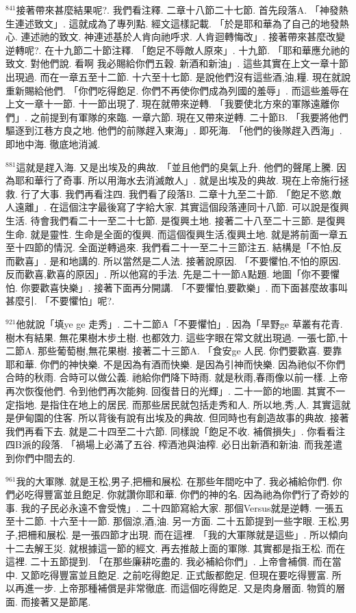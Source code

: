 \documentclass{book}
\begin{document}
$^{841}$接著帶來甚麼結果呢?.
我們看注釋.
二章十八節二十七節.
首先段落A.
「神發熱生連述致文」.
這就成為了專列點.
經文這樣記載.
「於是耶和華為了自己的地發熱心.
連述祂的致文.
神連述基於人肯向祂呼求.
人肯迴轉悔改」.
接著帶來甚麼改變逆轉呢?.
在十九節二十節注釋.
「飽足不辱敵人原來」.
十九節.
「耶和華應允祂的致文.
對他們說.
看啊 我必賜給你們五穀.
新酒和新油」.
這些其實在上文一章十節出現過.
而在一章五至十二節.
十六至十七節.
是說他們沒有這些酒,油,糧.
現在就說重新賜給他們.
「你們吃得飽足.
你們不再使你們成為列國的羞辱」.
而這些羞辱在上文一章十一節.
十一節出現了.
現在就帶來逆轉.
「我要使北方來的軍隊遠離你們」.
之前提到有軍隊的來臨.
一章六節.
現在又帶來逆轉.
二十節B.
「我要將他們驅逐到江巷方良之地.
他們的前隊趕入東海」.
即死海.
「他們的後隊趕入西海」.
即地中海.
徹底地消滅.

$^{881}$這就是趕入海.
又是出埃及的典故.
「並且他們的臭氣上升.
他們的聲尾上騰.
因為耶和華行了奇事.
所以用海水去消滅敵人」.
就是出埃及的典故.
現在上帝施行拯救.
行了大事.
我們再看注四.
我們看了段落B.
二章十九至二十節.
「飽足不慾,敵人遠離」.
在這個注字最後寫了字給大家.
其實這個段落連同十八節.
可以說是復興生活.
待會我們看二十一至二十七節.
是復興土地.
接著二十八至二十三節.
是復興生命.
就是靈性.
生命是全面的復興.
而這個復興生活,復興土地.
就是將前面一章五至十四節的情況.
全面逆轉過來.
我們看二十一至二十三節注五.
結構是「不怕,反而歡喜」.
是和地講的.
所以當然是二人法.
接著說原因.
「不要懼怕,不怕的原因.
反而歡喜,歡喜的原因」.
所以他寫的手法.
先是二十一節A點題.
地圖「你不要懼怕.
你要歡喜快樂」.
接著下面再分開講.
「不要懼怕,要歡樂」.
而下面甚麼故事叫甚麼引.
「不要懼怕」呢?.

$^{921}$他就說「填ye ge 走秀」.
二十二節A「不要懼怕」.
因為「旱野ge 草叢有花青.
樹木有結果.
無花果樹木步土樹.
也都效力.
這些字眼在常文就出現過.
一張七節,十二節A.
那些葡萄樹,無花果樹.
接著二十三節A.
「食安ge 人民.
你們要歡喜.
要靠耶和華.
你們的神快樂.
不是因為有酒而快樂.
是因為引神而快樂.
因為祂似不你們合時的秋雨.
合時可以做公義.
祂給你們降下時雨.
就是秋雨,春雨像以前一樣.
上帝再次恢復他們.
令到他們再次能夠.
回復昔日的光輝」.
二十一節的地圖.
其實不一定指地.
是指住在地上的居民.
而那些居民就包括走秀和人.
所以地,秀,人.
其實這就是伊甸園的住客.
所以背後有說有出埃及的典故.
但同時也有創造故事的典故.
接著我們再看下去.
就是二十四至二十六節.
同樣說「飽足不收.
補償損失」.
你看看注四B派的段落.
「禍場上必滿了五谷.
榨酒池與油榨.
必日出新酒和新油.
而我差遣到你們中間去的.

$^{961}$我的大軍隊.
就是王松,男子,把柵和展松.
在那些年間吃中了.
我必補給你們.
你們必吃得豐富並且飽足.
你就讚你耶和華.
你們的神的名.
因為祂為你們行了奇妙的事.
我的子民必永遠不會受愧」.
二十四節寫給大家.
那個Versus就是逆轉.
一張五至十二節.
十六至十一節.
那個涼,酒,油.
另一方面.
二十五節提到一些字眼.
王松,男子,把柵和展松.
是一張四節才出現.
而在這裡.
「我的大軍隊就是這些」.
所以傾向十二去解王災.
就根據這一節的經文.
再去推敲上面的軍隊.
其實都是指王松.
而在這裡.
二十五節提到.
「在那些廉耕吃盡的.
我必補給你們」.
上帝會補償.
而在當中.
又節吃得豐富並且飽足.
之前吃得飽足.
正式飯都飽足.
但現在要吃得豐富.
所以再進一步.
上帝那種補償是非常徹底.
而這個吃得飽足.
又是肉身層面.
物質的層面.
而接著又是節尾.
\end{document}
